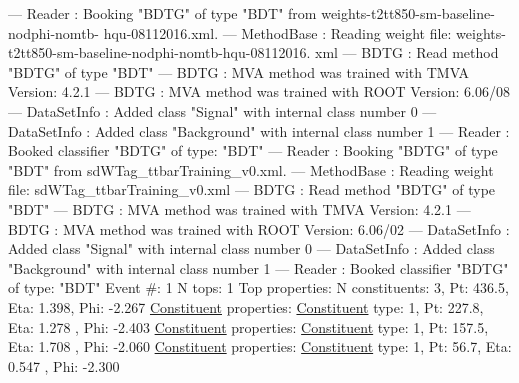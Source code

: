 \begin{DoxyCode}
--- Reader                   : Booking \textcolor{stringliteral}{"BDTG"} of type \textcolor{stringliteral}{"BDT"} from weights-t2tt850-sm-baseline-nodphi-nomtb-
      hqu-08112016.xml.
--- MethodBase               : Reading weight file: weights-t2tt850-sm-baseline-nodphi-nomtb-hqu-08112016.
      xml
--- BDTG                     : Read method \textcolor{stringliteral}{"BDTG"} of type \textcolor{stringliteral}{"BDT"}
--- BDTG                     : MVA method was trained with TMVA Version: 4.2.1
--- BDTG                     : MVA method was trained with ROOT Version: 6.06/08
--- DataSetInfo              : Added \textcolor{keyword}{class }"Signal"    with internal class number 0
--- DataSetInfo              : Added class "Background"      with internal class number 1
--- Reader                   : Booked classifier "BDTG" of type: "BDT"
--- Reader                   : Booking "BDTG" of type "BDT" from sdWTag\_ttbarTraining\_v0.xml.
--- MethodBase               : Reading weight file: sdWTag\_ttbarTraining\_v0.xml
--- BDTG                     : Read method "BDTG" of type "BDT"
--- BDTG                     : MVA method was trained with TMVA Version: 4.2.1
--- BDTG                     : MVA method was trained with ROOT Version: 6.06/02
--- DataSetInfo              : Added class "Signal"    with internal class number 0
--- DataSetInfo              : Added class "Background"      with internal class number 1
--- Reader                   : Booked classifier "BDTG" of type: "BDT"
Event #: 1
      N tops: 1
      Top properties: N constituents:   3,   Pt:  436.5,   Eta:   1.398,   Phi:  -2.267
          \hyperlink{classConstituent}{Constituent} properties: \hyperlink{classConstituent}{Constituent} type:   1,   Pt:  227.8,   Eta:   1.278
      ,   Phi:  -2.403
          \hyperlink{classConstituent}{Constituent} properties: \hyperlink{classConstituent}{Constituent} type:   1,   Pt:  157.5,   Eta:   1.708
      ,   Phi:  -2.060
          \hyperlink{classConstituent}{Constituent} properties: \hyperlink{classConstituent}{Constituent} type:   1,   Pt:   56.7,   Eta:   0.547
      ,   Phi:  -2.300


\end{DoxyCode}
